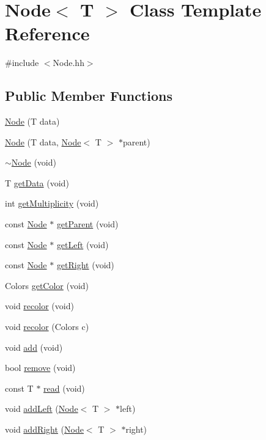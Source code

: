 \hypertarget{class_node}{}\section{Node$<$ T $>$ Class Template Reference}
\label{class_node}


{\ttfamily \#include $<$Node.\+hh$>$}

\subsection*{Public Member Functions}
\begin{DoxyCompactItemize}
\item 
\hyperlink{class_node_a0692b16d246460bf94c18d49592facdd}{Node} (T data)
\item 
\hyperlink{class_node_a7349325d564e6c20f471aaa013d00b59}{Node} (T data, \hyperlink{class_node}{Node}$<$ T $>$ $\ast$parent)
\item 
\hyperlink{class_node_a5fc413278a0bd22eb84e03c0ae90e22a}{$\sim$\+Node} (void)
\item 
T \hyperlink{class_node_ad89031c2899fe91646652ce4c2e79ab6}{get\+Data} (void)
\item 
int \hyperlink{class_node_ab83eb1cc81f91a5641693eb22712f8c8}{get\+Multiplicity} (void)
\item 
const \hyperlink{class_node}{Node} $\ast$ \hyperlink{class_node_a6c66ccb05ba8d8298b5e366e456d0938}{get\+Parent} (void)
\item 
const \hyperlink{class_node}{Node} $\ast$ \hyperlink{class_node_aa9b2793e1b2b50e722510c9d6426952b}{get\+Left} (void)
\item 
const \hyperlink{class_node}{Node} $\ast$ \hyperlink{class_node_a2bfe77dd9f9ede06efbb2176f0589e67}{get\+Right} (void)
\item 
Colors \hyperlink{class_node_a9c209bbcd6a8c1e07914a0c6bea3a6f4}{get\+Color} (void)
\item 
void \hyperlink{class_node_a431de433a18f187a322ff5fe3ce39c9c}{recolor} (void)
\item 
void \hyperlink{class_node_a28b5a3622c4379faa722995c1ba01ae4}{recolor} (Colors c)
\item 
void \hyperlink{class_node_aef85f7c8d30881449f35ac5fda836438}{add} (void)
\item 
bool \hyperlink{class_node_a2f77a48dceae8b8268826483f9671e1a}{remove} (void)
\item 
const T $\ast$ \hyperlink{class_node_a565b1a8bbc88c67b5dbc6a78a11a4ba2}{read} (void)
\item 
void \hyperlink{class_node_a78c42d0d8acc20440279aa851c02b38e}{add\+Left} (\hyperlink{class_node}{Node}$<$ T $>$ $\ast$left)
\item 
void \hyperlink{class_node_ae0a74454b02ab98b6c373dea65ac441e}{add\+Right} (\hyperlink{class_node}{Node}$<$ T $>$ $\ast$right)
\end{DoxyCompactItemize}


